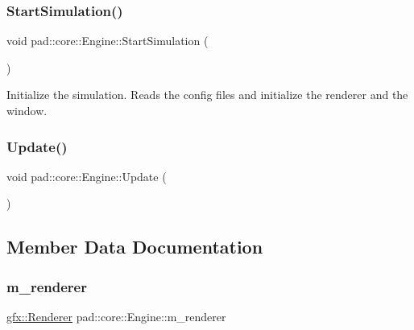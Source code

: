 \subsubsection{\texorpdfstring{Start\+Simulation()}{StartSimulation()}}
{\footnotesize\ttfamily void pad\+::core\+::\+Engine\+::\+Start\+Simulation (\begin{DoxyParamCaption}{ }\end{DoxyParamCaption})}

Initialize the simulation. Reads the config files and initialize the renderer and the window. \mbox{\label{classpad_1_1core_1_1_engine_afd5238cc10483197dfce90523d26cfd2}} 
\subsubsection{\texorpdfstring{Update()}{Update()}}
{\footnotesize\ttfamily void pad\+::core\+::\+Engine\+::\+Update (\begin{DoxyParamCaption}{ }\end{DoxyParamCaption})}



\subsection{Member Data Documentation}
\mbox{\label{classpad_1_1core_1_1_engine_a304fd19fdc472d1e2110220e31eaea96}} 
\subsubsection{\texorpdfstring{m\+\_\+renderer}{m\_renderer}}
{\footnotesize\ttfamily \mbox{\hyperlink{classpad_1_1gfx_1_1_renderer}{gfx\+::\+Renderer}} pad\+::core\+::\+Engine\+::m\+\_\+renderer\hspace{0.3cm}{\ttfamily [private]}}

\mbox{\label{classpad_1_1core_1_1_engine_a2ddf54acc2363098189237cf48ab504c}} 
